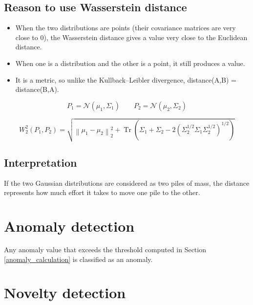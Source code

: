 \documentclass[a4paper]{article}
\begin{document}
      \subsection{Reason to use Wasserstein distance}
         \begin{itemize}
            \item When the two distributions are points (their covariance matrices are very close to 0), the Wasserstein distance gives a value very close to the Euclidean distance.
            \item When one is a distribution and the other is a point, it still produces a value.
            \item It is a metric, so unlike the Kullback--Leibler divergence, distance(A,B) = distance(B,A).
         \end{itemize}
         \[
         P_1
         =
         \mathcal{N}
         \left(
         \mu_1,
         \Sigma_1
         \right)
         \qquad
         P_2
         =
         \mathcal{N}
         \left(
         \mu_2,
         \Sigma_2
         \right)
         \]

         \[
         W_2^2
         \left(
         P_1,
         P_2
         \right)
         =
         \sqrt{
         \left\lVert
         \mu_1 - \mu_2
         \right\rVert_2^2
         +
         \operatorname{Tr}
         \left(
         \Sigma_1
         +
         \Sigma_2
         -
         2
         \left(
         \Sigma_2^{1/2}
         \Sigma_1
         \Sigma_2^{1/2}
         \right)^{1/2}
         \right)}
         \]


      \subsection{Interpretation}
         If the two Gaussian distributions are considered as two piles of mass, the distance represents how much effort it takes to move one pile to the other.



   \section{Anomaly detection}
      Any anomaly value that exceeds the threshold computed in Section \ref{anomaly_calculation} is classified as an anomaly.


   \section{Novelty detection}
\end{document}
